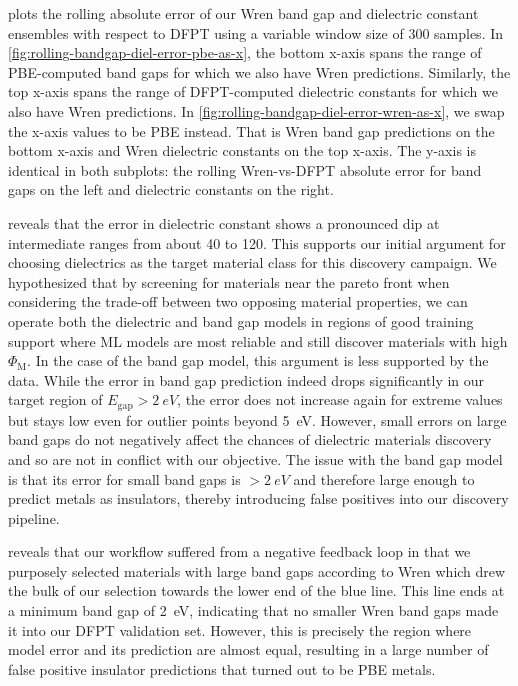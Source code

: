 \documentclass{article}
\newcommand{\fom}[1][]{\Phi_\text{M#1}}
\newcommand{\egap}{{E_\text{gap}}}
\begin{document}
 plots the rolling absolute error of our Wren band gap and dielectric constant ensembles with respect to DFPT using a variable window size of 300 samples.
In \cref{fig:rolling-bandgap-diel-error-pbe-as-x}, the bottom x-axis spans the range of PBE-computed band gaps for which we also have Wren predictions.
Similarly, the top x-axis spans the range of DFPT-computed dielectric constants for which we also have Wren predictions.
In \cref{fig:rolling-bandgap-diel-error-wren-as-x}, we swap the x-axis values to be PBE instead. That is Wren band gap predictions on the bottom x-axis and Wren dielectric constants on the top x-axis.
The y-axis is identical in both subplots: the rolling Wren-vs-DFPT absolute error for band gaps on the left and dielectric constants on the right.

 reveals that the error in dielectric constant shows a pronounced dip at intermediate ranges from about 40 to 120.
This supports our initial argument for choosing dielectrics as the target material class for this discovery campaign.
We hypothesized that by screening for materials near the pareto front when considering the trade-off between two opposing material properties, we can operate both the dielectric and band gap models in regions of good training support where ML models are most reliable and still discover materials with high $\fom$.
In the case of the band gap model, this argument is less supported by the data.
While the error in band gap prediction indeed drops significantly in our target region of $\egap > \SI{2}{eV}$, the error does not increase again for extreme values but stays low even for outlier points beyond \SI{5}{eV}.
However, small errors on large band gaps do not negatively affect the chances of dielectric materials discovery and so are not in conflict with our objective.
The issue with the band gap model is that its error for small band gaps is $> \SI{2}{eV}$ and therefore large enough to predict metals as insulators, thereby introducing false positives into our discovery pipeline.

 reveals that our workflow suffered from a negative feedback loop in that we purposely selected materials with large band gaps according to Wren which drew the bulk of our selection towards the lower end of the blue line. This line ends at a minimum band gap of \SI{2}{eV}, indicating that no smaller Wren band gaps made it into our DFPT validation set.
However, this is precisely the region where model error and its prediction are almost equal, resulting in a large number of false positive insulator predictions that turned out to be PBE metals.
\end{document}
